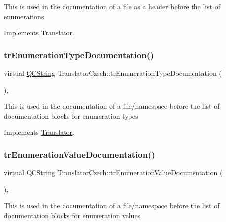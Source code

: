 This is used in the documentation of a file as a header before the list of enumerations 

Implements \mbox{\hyperlink{class_translator}{Translator}}.

\mbox{\label{class_translator_czech_ae434ce413f693a1d790313b9e1cc9522}} 
\subsubsection{\texorpdfstring{trEnumerationTypeDocumentation()}{trEnumerationTypeDocumentation()}}
{\footnotesize\ttfamily virtual \mbox{\hyperlink{class_q_c_string}{Q\+C\+String}} Translator\+Czech\+::tr\+Enumeration\+Type\+Documentation (\begin{DoxyParamCaption}{ }\end{DoxyParamCaption})\hspace{0.3cm}{\ttfamily [inline]}, {\ttfamily [virtual]}}

This is used in the documentation of a file/namespace before the list of documentation blocks for enumeration types 

Implements \mbox{\hyperlink{class_translator}{Translator}}.

\mbox{\label{class_translator_czech_a8b90e598df424c126b7413fe33134ec8}} 
\subsubsection{\texorpdfstring{trEnumerationValueDocumentation()}{trEnumerationValueDocumentation()}}
{\footnotesize\ttfamily virtual \mbox{\hyperlink{class_q_c_string}{Q\+C\+String}} Translator\+Czech\+::tr\+Enumeration\+Value\+Documentation (\begin{DoxyParamCaption}{ }\end{DoxyParamCaption})\hspace{0.3cm}{\ttfamily [inline]}, {\ttfamily [virtual]}}

This is used in the documentation of a file/namespace before the list of documentation blocks for enumeration values 

